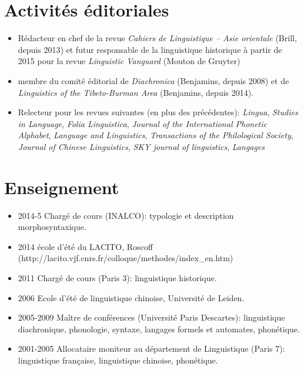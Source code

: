 \documentclass[oldfontcommands,oneside,a4paper,11pt]{article}
\begin{document}
 
  
  
 
\section*{Activités éditoriales}
\begin{itemize}
\item Rédacteur en chef de la revue \textit{Cahiers de Linguistique -- Asie orientale} (Brill, depuis 2013) et futur responsable de la linguistique historique à partir de 2015 pour la revue \textit{Linguistic Vanguard} (Mouton de Gruyter)
\item membre du comité éditorial de \textit{Diachronica} (Benjamins, depuis 2008) et de \textit{Linguistics of the Tibeto-Burman Area}  (Benjamins, depuis 2014).
\item Relecteur pour les revues suivantes (en plus des précédentes): \textit{Lingua}, \textit{Studies in Language}, \textit{Folia Linguistica}, \textit{Journal of the International Phonetic Alphabet},  \textit{Language and Linguistics}, \textit{Transactions of the Philological Society}, \textit{Journal of Chinese Linguistics}, \textit{SKY journal of linguistics}, \textit{Langages}
\end{itemize}

\section*{Enseignement}
\begin{itemize}
\item 2014-5 Chargé de cours (INALCO): typologie et description morphosyntaxique.
\item 2014 école d'été du LACITO, Roscoff ({\color{blue}http://lacito.vjf.cnrs.fr/colloque/methodes/index\_en.htm})
\item 2011 Chargé de cours (Paris 3): linguistique historique.
\item  2006 Ecole d'été de linguistique chinoise, Université de Leiden.
\item 2005-2009 Maître de conférences (Université Paris Descartes): linguistique diachronique, phonologie, syntaxe, langages formels et automates, phonétique.
\item 2001-2005 Allocataire moniteur au département de Linguistique (Paris 7): linguistique française, linguistique chinoise, phonétique.
\end{itemize}
\end{document}
